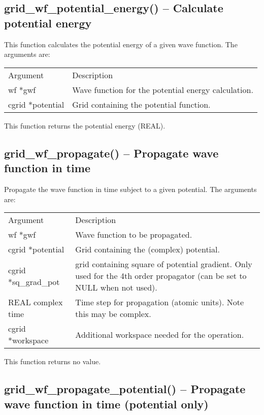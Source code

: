 \documentclass[12pt,letterpaper]{report}
\begin{document}
\subsection{grid\_wf\_potential\_energy() -- Calculate potential energy}

This function calculates the potential energy of a given wave function. The arguments are:
\begin{longtable}{p{} p{}}
Argument & Description\\
\cline{1-2}
wf *gwf & Wave function for the potential energy calculation.\\
cgrid *potential & Grid containing the potential function.\\
\end{longtable}
\noindent
This function returns the potential energy (REAL).

\subsection{grid\_wf\_propagate() -- Propagate wave function in time}

Propagate the wave function in time subject to a given potential. The arguments are:
\begin{longtable}{p{} p{}}
Argument & Description\\
\cline{1-2}
wf *gwf & Wave function to be propagated.\\
cgrid *potential & Grid containing the (complex) potential.\\
cgrid *sq\_grad\_pot & grid containing square of potential gradient. Only used for the 4th order propagator (can be set to NULL when not used).\\
REAL complex time & Time step for propagation (atomic units). Note this may be complex.\\
cgrid *workspace & Additional workspace needed for the operation.\\
\end{longtable}
\noindent
This function returns no value.

\subsection{grid\_wf\_propagate\_potential() -- Propagate wave function in time (potential only)}
\end{document}
